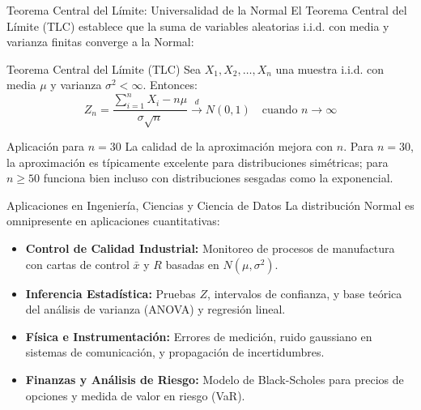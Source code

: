 \documentclass[10pt, aspectratio=169]{beamer}
\begin{document}
\begin{frame}{Teorema Central del Límite: Universalidad de la Normal}
  \footnotesize
  El Teorema Central del Límite (TLC) establece que la suma de variables aleatorias i.i.d. con media y varianza finitas converge a la Normal: \pause

  \vspace{0.1cm}
  \begin{block}{Teorema Central del Límite (TLC)}
    Sea $X_{1}, X_{2}, \dots, X_{n}$ una muestra i.i.d. con media $\mu$ y varianza $\sigma^{2} < \infty$. Entonces:
    $$Z_{n} = \dfrac{\sum_{i=1}^{n} X_{i} - n\mu}{\sigma\sqrt{n}} \xrightarrow{d} N(0, 1) \quad \text{cuando } n \to \infty$$
  \end{block}

  \vspace{0.1cm}
  \pause
  \begin{alertblock}{Aplicación para $n = 30$}
    La calidad de la aproximación mejora con $n$. Para $n = 30$, la aproximación es típicamente excelente para distribuciones simétricas; para $n \ge 50$ funciona bien incluso con distribuciones sesgadas como la exponencial.
  \end{alertblock}
\end{frame}

\begin{frame}{Aplicaciones en Ingeniería, Ciencias y Ciencia de Datos}
  \footnotesize
  La distribución Normal es omnipresente en aplicaciones cuantitativas: \pause

  \vspace{0.15cm}
  \begin{itemize}\itemsep=0.15cm
    \item \textbf{Control de Calidad Industrial:} Monitoreo de procesos de manufactura con cartas de control $\bar{x}$ y $R$ basadas en $N(\mu, \sigma^{2})$. \pause
    \item \textbf{Inferencia Estadística:} Pruebas $Z$, intervalos de confianza, y base teórica del análisis de varianza (ANOVA) y regresión lineal. \pause
    \item \textbf{Física e Instrumentación:} Errores de medición, ruido gaussiano en sistemas de comunicación, y propagación de incertidumbres. \pause
    \item \textbf{Finanzas y Análisis de Riesgo:} Modelo de Black-Scholes para precios de opciones y medida de valor en riesgo (VaR).
  \end{itemize}
\end{frame}
\end{document}
